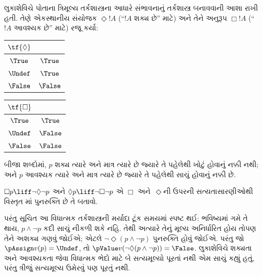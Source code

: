 \documentclass[../../../include/open-logic-section]{subfiles}
\begin{document}
લુકાશેવિચે પોતાના ત્રિમૂલ્ય તર્કશાસ્ત્રના આધારે સંભાવનાનું
તર્કશાસ્ત્ર બનાવવાની આશા રાખી હતી. તેણે એકસ્થાનીય
સંયોજક $\Diamond !A$ (``$!A$ શક્ય છે'' માટે) અને તેને અનુરૂપ
$\Box !A$ (``$!A$ આવશ્યક છે'' માટે) રજૂ કર્યા:
\begin{center}
  \begin{tabular}{c|c}
    $\tf{\Diamond}$ & \\
    \hline
    $\True$ & $\True$ \\
    $\Undef$ & $\True$ \\
    $\False$ & $\False$
  \end{tabular}
  \quad
  \begin{tabular}{c|c}
    $\tf{\Box}$ & \\
    \hline
    $\True$ & $\True$ \\
    $\Undef$ & $\False$ \\
    $\False$ & $\False$
  \end{tabular}
\end{center}
બીજા શબ્દોમાં, $p$ શક્ય ત્યારે અને માત્ર ત્યારે છે જ્યારે
તે પહેલેથી ખોટું હોવાનું નક્કી નથી; અને $p$ આવશ્યક ત્યારે
અને માત્ર ત્યારે છે જ્યારે તે પહેલેથી સાચું હોવાનું નક્કી છે.

\begin{prob}
  $\Box p \liff \lnot\Diamond \lnot p$ અને $\Diamond p \liff
  \lnot \Box \lnot p$ એ $\Box$ અને~$\Diamond$ની ઉપરની
  સત્યતાસારણીઓથી વિસ્તૃત \LogLuk[3]માં પુનરુક્તિ છે તે બતાવો.
\end{prob}

પરંતુ સૂચિત આ વિધાત્મક તર્કશાસ્ત્રની મર્યાદા ટૂંક સમયમાં
સ્પષ્ટ થઈ: ભવિષ્યમાં ગમે તે થાય, $p \land \lnot p$ કદી સાચું
નીકળી શકે નહિ. તેથી અત્યારે તેનું મૂલ્ય અનિર્ધારિત હોય તોપણ તેને
અશક્ય ગણવું જોઈએ; એટલે $\lnot \Diamond(p \land \lnot p)$ પુનરુક્તિ
હોવું જોઈએ. પરંતુ જો $\pAssign v(p) = \Undef$, તો
$\pValue v(\lnot \Diamond(p \land \lnot p)) = \False$.
લુકાશેવિચે શક્યતા અને આવશ્યકતા જેવા વિધાત્મક ભેદો માટે
બે સત્યમૂલ્યો પૂરતાં નથી એમ સાચું કહ્યું હતું, પરંતુ
ત્રીજું સત્યમૂલ્ય ઉમેરવું પણ પૂરતું નથી.
\end{document}
